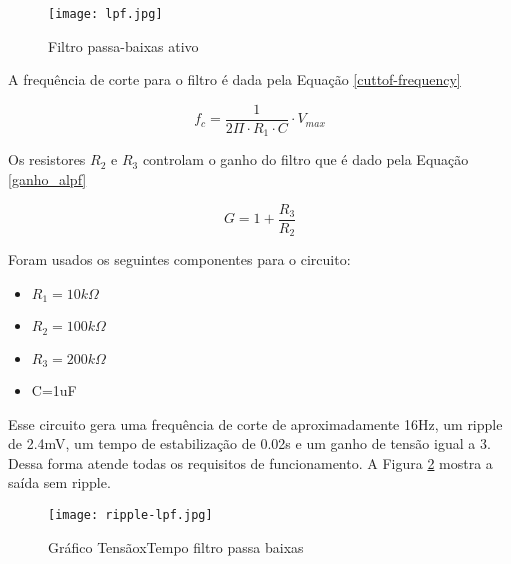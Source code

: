 \begin{figure}[htbp]
	\centering
	\texttt{[image: lpf.jpg]}
	\caption{Filtro passa-baixas ativo}
	\label{active-lpf}
\end{figure}

A frequência de corte para o filtro é dada pela Equação \ref{cuttof-frequency}

\begin{equation}\label{cutoff-frequency}
	f_{c}=\frac{ 1 }{ 2 \Pi \cdot R_{1}\cdot C } \cdot V_{max}
\end{equation}

Os resistores $R_{2}$ e $R_{3}$ controlam o ganho do filtro que é dado pela Equação \ref{ganho_alpf}

\begin{equation}\label{calc-analog-voltage}
	G= 1 + \frac{ R_{3} }{ R_{2} }
\end{equation}

Foram usados os seguintes componentes para o circuito:

\begin{itemize}
	\item $R_{1}=10k\Omega$
	\item $R_{2}=100k\Omega$
	\item $R_{3}=200k\Omega$
	\item C=1uF
\end{itemize}

Esse circuito gera uma frequência de corte de aproximadamente 16Hz, um ripple de 2.4mV, um tempo de estabilização de 0.02s e um ganho de tensão igual a 3. Dessa forma atende todas os requisitos de funcionamento. A Figura \ref{filter_out} mostra a saída sem ripple.

\begin{figure}[htbp]
	\centering
	\texttt{[image: ripple-lpf.jpg]}
	\caption{Gráfico TensãoxTempo filtro passa baixas}
	\label{filter_out}
\end{figure}
